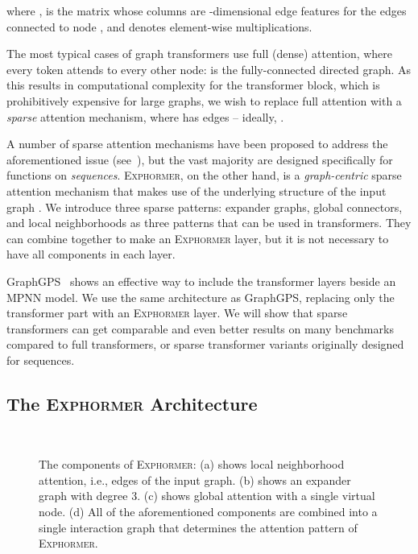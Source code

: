 \documentclass{article}
\theoremstyle{plain}
\theoremstyle{definition}
\theoremstyle{remark}
\begin{document}
where ,  is the  matrix whose columns are -dimensional edge features for the edges connected to node , and  denotes element-wise multiplications.


The most typical cases of graph transformers use full (dense) attention, where every token attends to every other node:  is the fully-connected directed graph. As this results in computational complexity  for the transformer block, which is prohibitively expensive for large graphs, we wish to replace full attention with a \emph{sparse} attention mechanism, where  has  edges -- ideally, . 

A number of sparse attention mechanisms have been proposed to address the aforementioned issue (see~\citealp{TayDBM20}), but the vast majority are designed specifically for functions on \emph{sequences}. \textsc{Exphormer}, on the other hand, is a \emph{graph-centric} sparse attention mechanism that makes use of the underlying structure of the input graph . We introduce three sparse patterns: expander graphs, global connectors, and local neighborhoods as three patterns that can be used in transformers. They can combine together to make an \textsc{Exphormer} layer, but it is not necessary to have all components in each layer. 

GraphGPS~\citep{RampasekGDLWB22} shows an effective way to include the transformer layers beside an MPNN model. We use the same architecture as GraphGPS, replacing only the transformer part with an \textsc{Exphormer} layer. We will show that sparse transformers can get comparable and even better results on many benchmarks compared to full transformers, or sparse transformer variants originally designed for sequences.


\subsection{The \textsc{Exphormer} Architecture}\label{sec:exphormerarch}

\begin{figure}[bt]
\vspace{-0.1in}
\captionsetup[subfloat]{}
\centering
{} 
\hspace{0.3in}
\\
\hspace{0.3in}

\caption{The components of \textsc{Exphormer}: (a) shows local neighborhood attention, i.e., edges of the input graph. (b) shows an expander graph with degree 3. (c) shows global attention with a single virtual node. (d) All of the aforementioned components are combined into a single interaction graph that determines the attention pattern of \textsc{Exphormer}.}
\label{fig:exphormer}
\vspace{-0.1in}
\end{figure}
\end{document}
